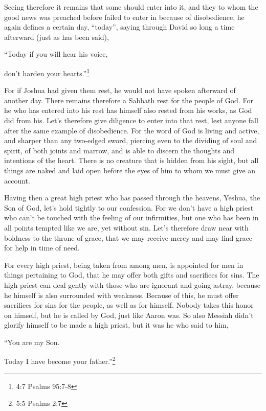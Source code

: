 \myverse{}Seeing therefore it remains that some should enter into it, and
they to whom the good news was preached before failed to enter in because of disobedience,
\myverse{}he again defines a certain day, “today”, saying through David so long a time
afterward (just as has been said),

“Today if you will hear his voice,

don’t harden your hearts.”\footnote{4:7 Psalms 95:7-8}

\myverse{}For if Joshua had given them rest, he would not have spoken afterward
of another day.
\myverse{}There remains therefore a Sabbath rest for the people of God.
\myverse{}For he who has entered into his rest has himself also rested from his works,
as God did from his.
\myverse{}Let’s therefore give diligence to enter into that rest, lest anyone fall after
the same example of disobedience.
\myverse{}For the word of God is living and active, and sharper than any two-edged sword,
piercing even to the dividing of soul and spirit, of both joints and marrow, and is able to discern the
thoughts and intentions of the heart.
\myverse{}There is no creature that is hidden from his sight, but all things are naked
and laid open before the eyes of him to whom we must give an account.

\myverse{}Having then a great high priest who has passed through the heavens,
Yeshua, the Son of God, let’s hold tightly to our confession.
\myverse{}For we don’t have a high priest who can’t be touched with the feeling of our
infirmities, but one who has been in all points tempted like we are, yet without sin.
\myverse{}Let’s therefore draw near with boldness to the throne of grace, that we may
receive mercy and may find grace for help in time of need.


\mychapter{} \myverse*{}For every high priest, being taken from among men, is appointed
for men in things pertaining to God, that he may offer both gifts and sacrifices for sins.
\myverse{}The high priest can deal gently with those who are ignorant and going astray,
because he himself is also surrounded with weakness.
\myverse{}Because of this, he must offer sacrifices for sins for the people, as well as
for himself.
\myverse{}Nobody takes this honor on himself, but he is called by God, just like Aaron
was.
\myverse{}So also Messiah didn’t glorify himself to be made a high priest, but it was
he who said to him,

“You are my Son.

Today I have become your father.”\footnote{5:5 Psalms 2:7}

